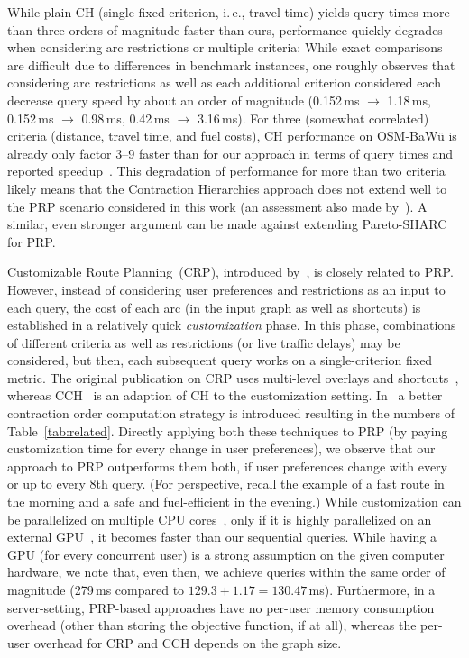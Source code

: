 \documentclass{sig-alternate}
\newcommand{\ie}{i.\,e.\xspace}
\begin{document}
While plain CH (single fixed criterion, \ie, travel time) yields query times more than three orders of magnitude faster than ours, performance quickly degrades when considering arc restrictions or multiple criteria: While exact comparisons are difficult due to differences in benchmark instances, one roughly observes that considering arc restrictions as well as each additional criterion considered each decrease query speed by about an order of magnitude (0.152\,ms $\rightarrow$ 1.18\,ms, 0.152\,ms $\rightarrow$ 0.98\,ms, 0.42\,ms $\rightarrow$ 3.16\,ms). For three (somewhat correlated) criteria (distance, travel time, and fuel costs), CH performance on OSM-BaWü is already only factor 3--9 faster than for our approach in terms of query times and reported speedup~\cite{fs-pcchm-13}. 
This degradation of performance for more than two criteria likely means that the Contraction Hierarchies approach does not extend well to the PRP scenario considered in this work (an assessment also made by~\cite{fns-opca-14}). A similar, even stronger argument can be made against extending Pareto-SHARC~\cite{dw-pps-09} for PRP.


Customizable Route Planning~(CRP), introduced by~\cite{dgpw-crprn-13}, is closely related to PRP. However, instead of considering user preferences and restrictions as an input to each query, the cost of each arc (in the input graph as well as shortcuts) is established in a relatively quick \emph{customization} phase. In this phase, combinations of different criteria as well as restrictions (or live traffic delays) may be considered, but then, each subsequent query works on a single-criterion fixed metric. The original publication on CRP uses multi-level overlays and shortcuts~\cite{dgpw-crprn-13}, whereas CCH~\cite{dsw-cch-sea-14} is an adaption of CH to the customization setting. In~\cite{hs-gbpo-15} a better contraction order computation strategy is introduced resulting in the numbers of Table~\ref{tab:related}.  Directly applying both these techniques to PRP (by paying customization time for every change in user preferences), we observe that our approach to PRP outperforms them both, if user preferences change with every or up to every 8th query. (For perspective, recall the example of a fast route in the morning and a safe and fuel-efficient in the evening.)  
While customization can be parallelized on multiple CPU cores~\cite{dgpw-crprn-13,dsw-cch-sea-14}, only if it is highly parallelized on an external GPU~\cite{dkw-cddgp-14}, it becomes faster than our sequential queries. 
While having a GPU (for every concurrent user) is a strong assumption on the given computer hardware, we note that, even then, we achieve queries within the same order of magnitude (279\,ms compared to $129.3+1.17=130.47$\,ms).
Furthermore, in a server-setting, PRP-based approaches have no per-user memory consumption overhead (other than storing the objective function, if at all), whereas the per-user overhead for CRP and CCH depends on the graph size.
\end{document}
